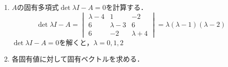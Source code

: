 \documentclass[dvipdfmx]{jsreport}
\begin{document}
\begin{souanswer}
\begin{enumerate}
\begin{itemize}
  \item $\ker{f}$の基底：$\begin{pmatrix}0\\ 2\\ 1\end{pmatrix}$
  \item $\ker{f}$の次元：$\dim{\ker{f}}= 1$
\end{itemize}
  階段行列の主成分は第一列と第二列にあるため，$A$の第一列と第二列のベクトルが$\img{f}$の基底を作る．
\begin{itemize}
  \item $\img{f}$の基底：$\begin{Bmatrix}\begin{pmatrix}4\\ -6\\ -6\end{pmatrix}, \begin{pmatrix}-1\\ 3\\ 2\end{pmatrix}\end{Bmatrix}$
  \item $\img{f}$の次元：$\dim{\img{f}}= \rank{A}= 2$
\end{itemize}
  \item $A$の固有多項式$\det{\lambda I- A}= 0$を計算する．
\begin{equation*}
  \det{\lambda I- A}= 
\begin{vmatrix}
  \lambda- 4& 1& -2\\
  6& \lambda- 3& 6\\
  6& -2& \lambda+ 4
\end{vmatrix}= \lambda(\lambda- 1)(\lambda- 2)
\end{equation*}
  $\det{\lambda I- A}= 0$を解くと，$\lambda= 0, 1, 2$
  \item 各固有値に対して固有ベクトルを求める．
\end{enumerate}
\end{souanswer}
\end{document}
